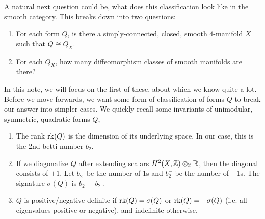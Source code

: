 \documentclass[12pt]{article}
\begin{document}
A natural next question could be, what does this classification look like in the smooth category. This breaks down into two questions: 
\begin{enumerate}
    \item[Q1.] For each form $Q$, is there a simply-connected, closed, smooth $4$-manifold $X$ such that $Q \cong Q_X$.
    \item[Q2.] For each $Q_X$, how many diffeomorphism classes of smooth manifolds are there?   
\end{enumerate}

In this note, we will focus on the first of these, about which we know quite a lot. Before we move forwards, we want some form of classification of forms $Q$ to break our answer into simpler cases. We quickly recall some invariants of unimodular, symmetric, quadratic forms $Q$, 
\begin{enumerate}
    \item The rank $\operatorname{rk}(Q)$ is the dimension of its underlying space. In our case, this is the 2nd betti number $b_2$.
    \item If we diagonalize $Q$ after extending scalars $H^2(X, \mathbb Z) \otimes_\mathbb Z \mathbb R$, then the diagonal consists of $\pm 1$. Let $b_2^+$ be the number of $1$s and $b_2^-$ be the number of $-1$s. The signature $\sigma(Q)$ is $b_2^+ - b_2^-$. 
    \item $Q$ is positive/negative definite if $\operatorname{rk}(Q) = \sigma(Q)$ or $\operatorname{rk}(Q) = -\sigma(Q)$ (i.e. all eigenvalues positive or negative), and indefinite otherwise.
\end{enumerate}
\end{document}

